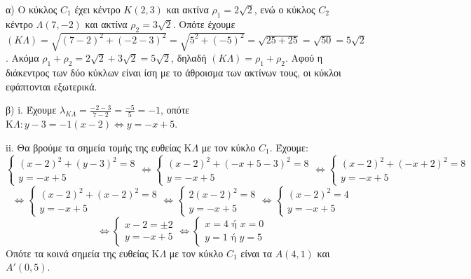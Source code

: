 α) Ο κύκλος $C_1$ έχει κέντρο $K(2,3)$ και ακτίνα $\rho_1 = 2\sqrt{2}$, ενώ ο κύκλος $C_2$ κέντρο $\Lambda(7,-2)$ και ακτίνα $\rho_2 = 3\sqrt{2}$.
Οπότε έχουμε $(K\Lambda) = \sqrt{(7-2)^2+(-2-3)^2} = \sqrt{5^2+(-5)^2} = \sqrt{25+25} = \sqrt{50} = 5\sqrt{2}$.
Ακόμα $\rho_1+\rho_2 = 2\sqrt{2}+3\sqrt{2} = 5\sqrt{2}$, δηλαδή $(K\Lambda) = \rho_1+\rho_2$.
Αφού η διάκεντρος των δύο κύκλων είναι ίση με το άθροισμα των ακτίνων τους, οι κύκλοι εφάπτονται εξωτερικά.

β)
i. Έχουμε $\lambda_{K\Lambda} = \frac{-2-3}{7-2} = \frac{-5}{5} = -1$, οπότε $\mathrm{K}\Lambda: y-3 = -1(x-2) \Leftrightarrow y = -x+5$.

ii. Θα βρούμε τα σημεία τομής της ευθείας $\mathrm{K}\Lambda$ με τον κύκλο $C_1$.
Έχουμε:
\[
\left\{
\begin{array}{l}
(x-2)^2+(y-3)^2=8 \\
y=-x+5
\end{array}
\right.
\Leftrightarrow
\left\{
\begin{array}{l}
(x-2)^2+(-x+5-3)^2=8 \\
y=-x+5
\end{array}
\right.
\Leftrightarrow
\left\{
\begin{array}{l}
(x-2)^2+(-x+2)^2=8 \\
y=-x+5
\end{array}
\right.
\]
\[
\Leftrightarrow
\left\{
\begin{array}{l}
(x-2)^2+(x-2)^2=8 \\
y=-x+5
\end{array}
\right.
\Leftrightarrow
\left\{
\begin{array}{l}
2(x-2)^2=8 \\
y=-x+5
\end{array}
\right.
\Leftrightarrow
\left\{
\begin{array}{l}
(x-2)^2=4 \\
y=-x+5
\end{array}
\right.
\]
\[
\Leftrightarrow
\left\{
\begin{array}{l}
x-2=\pm 2 \\
y=-x+5
\end{array}
\right.
\Leftrightarrow
\left\{
\begin{array}{l}
x=4 \text{ ή } x=0 \\
y=1 \text{ ή } y=5
\end{array}
\right.
\]
Οπότε τα κοινά σημεία της ευθείας $\mathrm{K}\Lambda$ με τον κύκλο $C_1$ είναι τα $A(4,1)$ και $A'(0,5)$.

